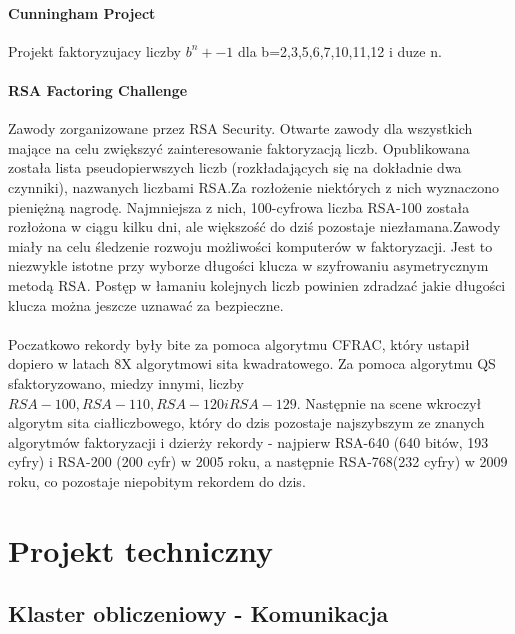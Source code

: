 \documentclass{article}
\begin{document}
\paragraph{Cunningham Project} Projekt faktoryzujacy liczby $b^n +-1$ dla b=2,3,5,6,7,10,11,12 i duze n.\cite{cun}

\paragraph{RSA Factoring Challenge} Zawody zorganizowane przez RSA Security. Otwarte zawody dla wszystkich mające na celu zwiększyć zainteresowanie faktoryzacją liczb. Opublikowana została lista pseudopierwszych liczb (rozkładających się na dokładnie dwa czynniki), nazwanych liczbami RSA.Za rozłożenie niektórych z nich wyznaczono pieniężną nagrodę. Najmniejsza z nich, 100-cyfrowa liczba RSA-100 została rozłożona w ciągu kilku dni, ale większość do dziś pozostaje niezłamana.Zawody miały na celu śledzenie rozwoju możliwości komputerów w faktoryzacji. Jest to niezwykle istotne przy wyborze długości klucza w szyfrowaniu asymetrycznym metodą RSA. Postęp w łamaniu kolejnych liczb powinien zdradzać jakie długości klucza można jeszcze uznawać za bezpieczne.\cite{rsafactoringchallenge}

\paragraph{}Poczatkowo rekordy były bite za pomoca algorytmu CFRAC, który ustapił dopiero w latach 8X algorytmowi sita kwadratowego. Za pomoca algorytmu QS sfaktoryzowano, miedzy innymi, liczby $RSA-100, RSA-110, RSA-120 i RSA-129$. Następnie na scene wkroczył algorytm sita ciałliczbowego, który do dzis pozostaje najszybszym ze znanych algorytmów faktoryzacji i dzierży rekordy - najpierw RSA-640 (640 bitów, 193 cyfry) i RSA-200 (200 cyfr) w 2005 roku, a następnie RSA-768(232 cyfry) w 2009 roku, co pozostaje niepobitym rekordem do dzis.

\section{Projekt techniczny}

\subsection{Klaster obliczeniowy - Komunikacja}
\end{document}
